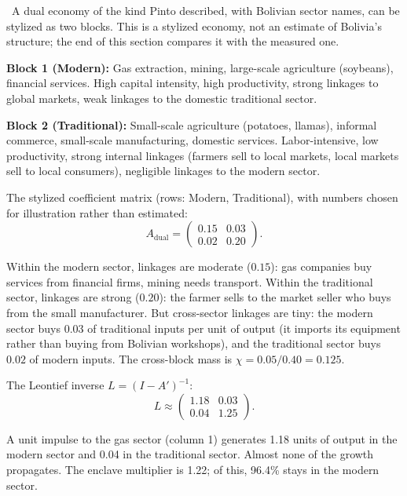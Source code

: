 \documentclass[../structural_economics_book.tex]{subfiles}
\begin{document}
\begin{example}\label{ch03:ex:bolivia}
\illustrative\ A dual economy of the kind Pinto described, with Bolivian sector names, can be stylized as two blocks. This is a stylized economy, not an estimate of Bolivia's structure; the end of this section compares it with the measured one.

\textbf{Block 1 (Modern):} Gas extraction, mining, large-scale agriculture (soybeans), financial services. High capital intensity, high productivity, strong linkages to global markets, weak linkages to the domestic traditional sector.

\textbf{Block 2 (Traditional):} Small-scale agriculture (potatoes, llamas), informal commerce, small-scale manufacturing, domestic services. Labor-intensive, low productivity, strong internal linkages (farmers sell to local markets, local markets sell to local consumers), negligible linkages to the modern sector.

The stylized coefficient matrix (rows: Modern, Traditional), with numbers chosen for illustration rather than estimated:
\begin{equation}
A_{\text{dual}} = \begin{pmatrix} 0.15 & 0.03 \\ 0.02 & 0.20 \end{pmatrix}.
\end{equation}

Within the modern sector, linkages are moderate ($0.15$): gas companies buy services from financial firms, mining needs transport. Within the traditional sector, linkages are strong ($0.20$): the farmer sells to the market seller who buys from the small manufacturer. But cross-sector linkages are tiny: the modern sector buys $0.03$ of traditional inputs per unit of output (it imports its equipment rather than buying from Bolivian workshops), and the traditional sector buys $0.02$ of modern inputs. The cross-block mass is $\chi = 0.05/0.40 = 0.125$.

The Leontief inverse $L = (I - A')^{-1}$:
\begin{equation}
L \approx \begin{pmatrix} 1.18 & 0.03 \\ 0.04 & 1.25 \end{pmatrix}.
\end{equation}

A unit impulse to the gas sector (column 1) generates 1.18 units of output in the modern sector and 0.04 in the traditional sector. Almost none of the growth propagates. The enclave multiplier is 1.22; of this, 96.4\% stays in the modern sector.


\end{example}
\end{document}
